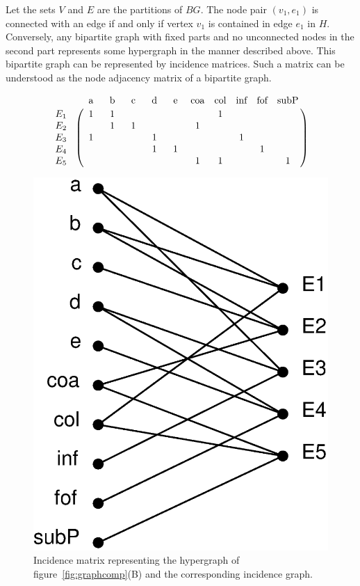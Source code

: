 \begin{mydef}
Let the sets $V$ and $E$ are the partitions of $BG$. The node pair $(v_1, e_1)$ is connected with an edge if and only if vertex $v_1$ is contained in edge $e_1$ in $H$. Conversely, any bipartite graph with fixed parts and no unconnected nodes in the second part represents some hypergraph in the manner described above. This bipartite graph can be represented by incidence matrices. Such a matrix can be understood as the node adjacency matrix of a bipartite graph.
\end{mydef}
\begin{figure}[tbh]
\centering
\begin{minipage}[c]{0.58\textwidth}\centering
\[ \bordermatrix{ ~       &  \text{~a~}  &  \text{~b~}  &  \text{~c~}  &  \text{~d~}  &  \text{~e~}  &   \text{coa} &   \text{col} &   \text{inf} &   \text{fof} &   \text{subP}\cr
                  E_1~~   &   1   &   1   &       &       &       &       &   1   &       &       &       \cr
                  E_2~~   &       &   1   &   1   &       &       &   1   &       &       &       &       \cr
                  E_3~~   &   1   &       &       &   1   &       &       &       &   1   &       &       \cr
                  E_4~~   &       &       &       &   1   &   1   &       &       &       &   1   &       \cr
                  E_5~~   &       &       &       &       &       &   1   &   1   &       &       &    1}
\]
\end{minipage}
\hfill
\begin{minipage}[c]{0.38\textwidth}\centering
\includegraphics[width=.7\textwidth]{fig/BG-black.eps}
\end{minipage}
\caption[An example incidence matrix of a hypergraph]{\label{fig:incidence}Incidence matrix representing the hypergraph of figure~\ref{fig:graphcomp}(B) and the corresponding incidence graph.}
\end{figure}

